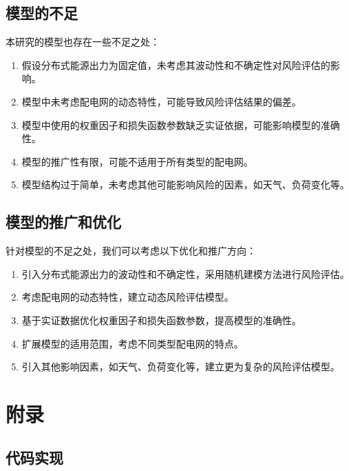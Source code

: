 \documentclass{article}
\begin{document}
\subsection{模型的不足}\label{subsec:disadvantages}

本研究的模型也存在一些不足之处：

\begin{enumerate}
  \item 假设分布式能源出力为固定值，未考虑其波动性和不确定性对风险评估的影响。
  \item 模型中未考虑配电网的动态特性，可能导致风险评估结果的偏差。
  \item 模型中使用的权重因子和损失函数参数缺乏实证依据，可能影响模型的准确性。
  \item 模型的推广性有限，可能不适用于所有类型的配电网。
  \item 模型结构过于简单，未考虑其他可能影响风险的因素，如天气、负荷变化等。
\end{enumerate}

\subsection{模型的推广和优化}\label{subsec:promotion_optimization}

针对模型的不足之处，我们可以考虑以下优化和推广方向：

\begin{enumerate}
  \item 引入分布式能源出力的波动性和不确定性，采用随机建模方法进行风险评估。
  \item 考虑配电网的动态特性，建立动态风险评估模型。
  \item 基于实证数据优化权重因子和损失函数参数，提高模型的准确性。
  \item 扩展模型的适用范围，考虑不同类型配电网的特点。
  \item 引入其他影响因素，如天气、负荷变化等，建立更为复杂的风险评估模型。
\end{enumerate}

\section{附录}\label{sec:appendix}

\subsection{代码实现}\label{subsec:code}

\end{document}
